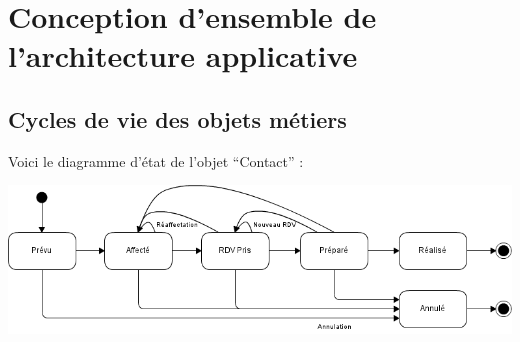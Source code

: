 

\section{Conception d'ensemble de l'architecture applicative}


\subsection{Cycles de vie des objets métiers}

Voici le diagramme d'état de l'objet ``Contact'' :

\begin {center}
\includegraphics[width=\textwidth]{diagramme-etat-objet-contact.png}
\end {center}
